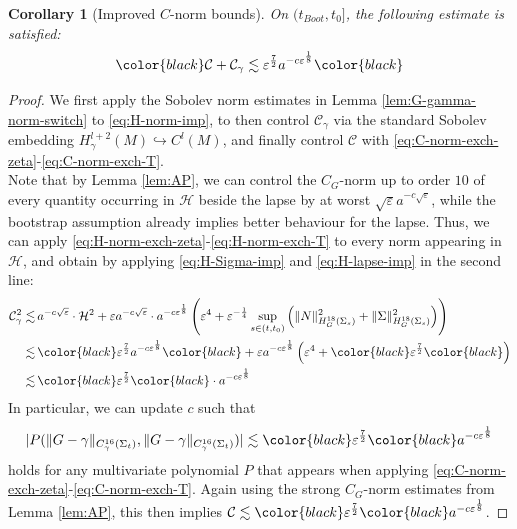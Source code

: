 \documentclass[11pt,leqno,textwidth=10cm]{amsart}
\numberwithin{equation}{section}
\theoremstyle{definition}
\theoremstyle{plain}
\newtheorem{corollary}[definition]{Corollary}
\newcommand{\1}{\mathbbm{1}}
\newcommand{\Ric}{\text{\normalfont{Ric}}}
\renewcommand{\epsilon}{\varepsilon}
\newcommand{\Gamhat}{\hat{\Gamma}}
\newcommand{\RE}{\bm{E}}
\newcommand{\RB}{\bm{B}}
\newcommand{\change}[1]{\color{black}#1\color{black}}
\begin{document}
\begin{corollary}[Improved $C$-norm bounds]\label{cor:C-impr} On $(t_{Boot},t_0]$, the following estimate is satisfied:
\begin{equation}\label{eq:C-impr}
\change{\mathcal{C}+\mathcal{C}_\gamma\lesssim\epsilon^\frac72a^{-c\epsilon^\frac18}}
\end{equation}
\end{corollary}
\begin{proof}
We first apply the Sobolev norm estimates in Lemma \ref{lem:G-gamma-norm-switch} \change{to \eqref{eq:H-norm-imp}}, to then control $\mathcal{C}_\gamma$ via the standard Sobolev embedding $H^{l+2}_\gamma(M)\hookrightarrow C^l(M)$, and finally control $\mathcal{C}$ with \eqref{eq:C-norm-exch-zeta}-\eqref{eq:C-norm-exch-T}.\\
Note that by Lemma \ref{lem:AP}, we can control the $C_G$-norm up to order $10$ of every quantity occurring in $\mathcal{H}$ beside the lapse by at worst $\sqrt{\epsilon}a^{-c\sqrt{\epsilon}}$, while the bootstrap assumption already implies better behaviour for the lapse. Thus, we can apply \eqref{eq:H-norm-exch-zeta}-\eqref{eq:H-norm-exch-T} to every norm appearing in $\mathcal{H}$, and obtain by applying \eqref{eq:H-Sigma-imp} and \eqref{eq:H-lapse-imp} in the second line:
\begin{align*}
\mathcal{C}_\gamma^2\lesssim&\,a^{-c\sqrt{\epsilon}}\cdot \mathcal{H}^2+\epsilon a^{-c\sqrt{\epsilon}}\cdot a^{-c\epsilon^\frac18}\left(\epsilon^4+\epsilon^{-\frac14}\sup_{s\in(t,t_0)}\left(\|N\|_{H^{18}_G(\Sigma_s)}^2+\|\Sigma\|_{H^{18}_G(\Sigma_s)}^2\right)\right)\\
\lesssim&\,\change{\epsilon^\frac72a^{-c\epsilon^\frac18}}+\epsilon a^{-c\epsilon^\frac18}\left(\epsilon^4+\change{\epsilon^\frac72}\right)\\
\lesssim&\,\change{\epsilon^\frac72}\cdot a^{-c\epsilon^\frac18}
\end{align*}
In particular, we can update $c$ such that
\[\lvert P(\|G-\gamma\|_{C^{16}_\gamma(\Sigma_t)},\|G-\gamma\|_{C^{16}_\gamma(\Sigma_t)})\rvert\lesssim\change{\epsilon^\frac72} a^{-c\epsilon^\frac18}\]
holds for any multivariate polynomial $P$ that appears when applying \eqref{eq:C-norm-exch-zeta}-\eqref{eq:C-norm-exch-T}. Again using the strong $C_G$-norm estimates from Lemma \ref{lem:AP}, this then implies $\mathcal{C}\lesssim \change{\epsilon^\frac72} a^{-c\epsilon^\frac18}$.

\end{proof}
\end{document}
